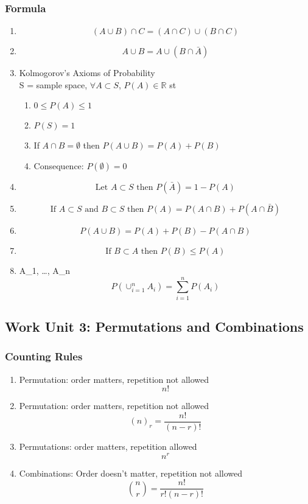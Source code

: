 \documentclass[a4paper,10pt]{article}
\begin{document}
\subsubsection{Formula}
\begin{enumerate}
	\item \[ (A\cup B)\cap C = (A\cap C)\cup (B\cap C)\]
	\item \[ A \cup B = A\cup (B\cap \bar{A})\]
	\item Kolmogorov's Axioms of Probability \\ S = sample space, $\forall A\subset S$, $P(A) \in \mathbb{R}$ st
	\begin{enumerate}
		\item $0\leq P(A) \leq1$
		\item $P(S) = 1$
		\item If $A\cap B = \emptyset$ then $P(A\cup B) = P(A)+P(B)$
		\item Consequence: $P(\emptyset) = 0$
	\end{enumerate}
	\item \[  \text{Let } A\subset S \text{ then } P(\bar{A}) = 1 - P(A)\]
	\item \[ \text{If }A\subset S \text{ and } B\subset S \text{ then } P(A) = P(A\cap B)+P(A\cap \bar{B})\]
	\item \[ P(A\cup B) = P(A)+P(B)-P(A\cap B) \]
	\item \[ \text{If } B\subset A \text{ then } P(B)\leq P(A) \]
	\item  {} A_1, \ldots , A_n  \[ P(\cup_{i = 1}^{n}A_i) = \sum_{i=1}^{n}P(A_i)\]
\end{enumerate}

\subsection{Work Unit 3: Permutations and Combinations}
\subsubsection{Counting Rules}
\begin{enumerate}
	\item Permutation: order matters, repetition not allowed \[ n!\]
	\item Permutation: order matters, repetition not allowed \[ (n)_r = \frac{n!}{(n-r)!}\]
	\item Permutations: order matters, repetition allowed \[ n^r \]
	\item Combinations: Order doesn't matter, repetition not allowed \[\binom{n}{r}  = \frac{n!}{r!(n-r)!}\]
\end{enumerate}
\end{document}
